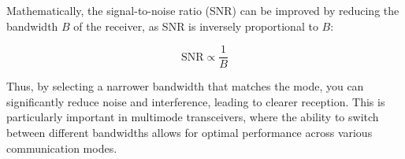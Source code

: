 Mathematically, the signal-to-noise ratio (SNR) can be improved by reducing the bandwidth \( B \) of the receiver, as SNR is inversely proportional to \( B \):

\[
\text{SNR} \propto \frac{1}{B}
\]

Thus, by selecting a narrower bandwidth that matches the mode, you can significantly reduce noise and interference, leading to clearer reception. This is particularly important in multimode transceivers, where the ability to switch between different bandwidths allows for optimal performance across various communication modes.

